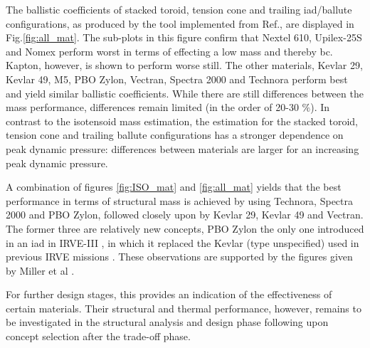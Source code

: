 The ballistic coefficients of stacked toroid, tension cone and trailing \gls{iad}/ballute configurations, as produced by the tool implemented from Ref.\cite{Samareh2011}, are displayed in Fig.\ref{fig:all_mat}. The sub-plots in this figure confirm that Nextel 610, Upilex-25S and Nomex perform worst in terms of effecting a low mass and thereby \gls{bc}. Kapton, however, is shown to perform worse still. The other materials, Kevlar 29, Kevlar 49, M5, PBO Zylon, Vectran, Spectra 2000 and Technora perform best and yield similar ballistic coefficients. While there are still differences between the mass performance, differences remain limited (in the order of 20-30 $\%$). In contrast to the isotensoid mass estimation, the estimation for the stacked toroid, tension cone and trailing ballute configurations has a stronger dependence on peak dynamic pressure: differences between materials are larger for an increasing peak dynamic pressure.

A combination of figures \ref{fig:ISO_mat} and \ref{fig:all_mat} yields that the best performance in terms of structural mass is achieved by using Technora, Spectra 2000 and PBO Zylon, followed closely upon by Kevlar 29, Kevlar 49 and Vectran. The former three are relatively new concepts, PBO Zylon the only one introduced in an \gls{iad} in IRVE-III \cite{Dillman2012}, in which it replaced the Kevlar (type unspecified) used in previous IRVE missions \cite{Lindell2006}. These observations are supported by the figures given by Miller et al \cite[p.7-p.8]{Miller2014}. 

For further design stages, this provides an indication of the effectiveness of certain materials. Their structural and thermal performance, however, remains to be investigated in the structural analysis and design phase following upon concept selection after the trade-off phase. 


